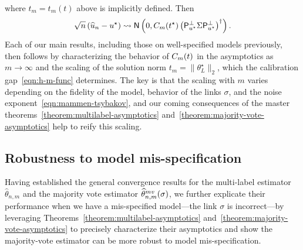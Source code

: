 \documentclass[11pt]{article}
\newcommand{\prn}[1]{\left({#1}\right)} %
\newcommand{\what}[1]{\widehat{#1}}
\newcommand{\normal}{\mathsf{N}}
\newcommand{\mv}{^{\textup{mv}}}
\newcommand{\proj}{\mathsf{P}}
\newcommand{\projperp}{\proj_{u\opt}^\perp}
\newcommand{\norms}[1]{\|{#1}\|} %
\newcommand{\ltwos}[1]{\norms{#1}_2} %
\newcommand{\<}{\langle} %
\renewcommand{\>}{\rangle}
\newcommand{\cd}{\rightsquigarrow}
\newcommand{\red}[1]{\textcolor{red}{#1}}
\newcommand{\jcdcomment}[1]{\fcolorbox{outerlinecolor}{innerboxcolor}{
    \begin{minipage}{.9\textwidth}
      \red{\bf JCD Comment:} {#1}
  \end{minipage}} \\
}
\newcommand{\opt}{^\star}
\newcommand{\gme}{\what{\theta}_{n,m}} %
\newcommand{\mve}{\what{\theta}\mv_{n,m}} %
\begin{document}
where $t_m = t_m(t)$ above is implicitly defined.  Then
\begin{equation*}
  \sqrt{n}\left(\what{u}_n - u\opt\right)
  \cd \normal\left(0,
  \varfunc(t\opt) \prn{\projperp \Sigma \projperp}^\dagger
  \right).
\end{equation*}
Each of our main results, including those on well-specified models
previously, then follows by characterizing the behavior of $C_m(t)$ in
the asymptotics as $m \to \infty$ and the scaling
of the solution norm $t_m = \ltwos{\theta_L\opt}$,
which the calibration gap~\eqref{eqn:h-m-func} determines.
The key is that the scaling with $m$ varies depending on
the fidelity of the model, behavior of the links $\sigma$, and
the noise exponent~\eqref{eqn:mammen-tsybakov}, and our coming
consequences of the master theorems~\ref{theorem:multilabel-asymptotics}
and~\ref{theorem:majority-vote-asymptotics} help to reify this scaling.


%

\subsection{Robustness to model mis-specification}
\label{sec:robustness-model-misspecification}

Having established the general convergence results for the multi-label
estimator $\gme$ and the majority vote estimator $\mve(\sigma)$, we further
explicate their performance when we have a mis-specified model---the link
$\sigma$ is incorrect---by leveraging
Theorems~\ref{theorem:multilabel-asymptotics}
and~\ref{theorem:majority-vote-asymptotics} to precisely characterize their
asymptotics and show the majority-vote estimator can be more robust to model
mis-specification.
\end{document}
